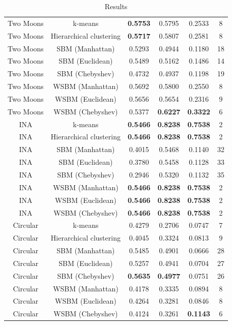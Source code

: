 \documentclass[conference]{IEEEtran}
\begin{document}
\begin{table}[t]
\begin{tabular}{c | c | c c c | c}
    \hline
    Two Moons & k-means & \textbf{0.5753} & 0.5795 & 0.2533 & 8 \\
    Two Moons & Hierarchical clustering & \textbf{0.5717} & 0.5807 & 0.2581 & 8 \\
    Two Moons & SBM (Manhattan) & 0.5293 & 0.4944 & 0.1180 & 18 \\
    Two Moons & SBM (Euclidean) & 0.5489 & 0.5162 & 0.1486 & 14 \\
    Two Moons & SBM (Chebyshev) & 0.4732 & 0.4937 & 0.1198 & 19 \\
    Two Moons & WSBM (Manhattan) & 0.5692 & 0.5800 & 0.2550 & 8 \\
    Two Moons & WSBM (Euclidean) & 0.5656 & 0.5654 & 0.2316 & 9 \\
    Two Moons & WSBM (Chebyshev) & 0.5377 & \textbf{0.6227} & \textbf{0.3322} & 6 \\
    \hline
    INA & k-means & \textbf{0.5466} & \textbf{0.8238} & \textbf{0.7538} & 2 \\
    INA & Hierarchical clustering  & \textbf{0.5466} & \textbf{0.8238} & \textbf{0.7538} & 2 \\
    INA & SBM (Manhattan) & 0.4015 & 0.5468 & 0.1140 & 32 \\
    INA & SBM (Euclidean) & 0.3780 & 0.5458 & 0.1128 & 33 \\
    INA & SBM (Chebyshev) & 0.2946 & 0.5320 & 0.1132 & 35 \\
    INA & WSBM (Manhattan)  & \textbf{0.5466} & \textbf{0.8238} & \textbf{0.7538} & 2 \\
    INA & WSBM (Euclidean)  & \textbf{0.5466} & \textbf{0.8238} & \textbf{0.7538} & 2 \\
    INA & WSBM (Chebyshev)  & \textbf{0.5466} & \textbf{0.8238} & \textbf{0.7538} & 2 \\

    \hline
    Circular & k-means & 0.4279 & 0.2706 & 0.0747 & 7 \\
    Circular & Hierarchical clustering & 0.4045 & 0.3324 & 0.0813 & 9 \\
    Circular & SBM (Manhattan) & 0.5485 & 0.4901 & 0.0666 & 28 \\
    Circular & SBM (Euclidean) & 0.5257 & 0.4941 & 0.0704 & 27 \\
    Circular & SBM (Chebyshev) & \textbf{0.5635} & \textbf{0.4977} & 0.0751 & 26 \\
    Circular & WSBM (Manhattan) & 0.4178 & 0.3335 & 0.0894 & 8 \\
    Circular & WSBM (Euclidean) & 0.4264 & 0.3281 & 0.0846 & 8 \\
    Circular & WSBM (Chebyshev) & 0.4124 & 0.3261 & \textbf{0.1143} & 6 \\


  \end{tabular}
  \caption{Results}
  \label{tab:results_full}
\end{table}
\end{document}

